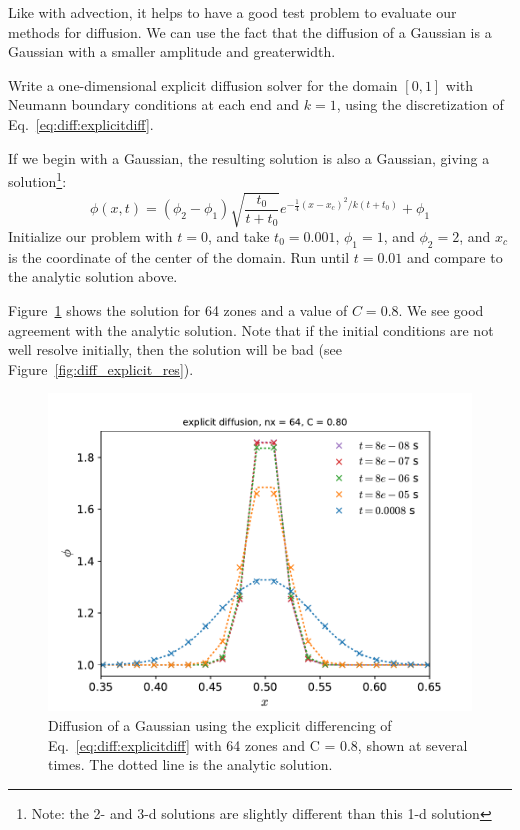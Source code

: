 Like with advection, it helps to have a good test problem to evaluate our
methods for diffusion.  We can use the fact that the diffusion of a Gaussian
is a Gaussian with a smaller amplitude and greaterwidth.

\begin{exercise}
{Write a one-dimensional explicit diffusion solver for the
  domain $[0,1]$ with Neumann boundary conditions at each end and $k = 1$,
  using the discretization of Eq.~\ref{eq:diff:explicitdiff}.

  If we begin with a Gaussian, the resulting solution is also a Gaussian,
  giving a solution\footnote{Note: the 2- and 3-d solutions are slightly different than this 1-d solution}:
  \begin{equation}
   \phi(x,t) = (\phi_2 - \phi_1) \sqrt{\frac{t_0}{t + t_0}} e^{-\frac{1}{4}(x - x_c)^2/k(t+t_0)} + \phi_1
  \end{equation}
  Initialize our problem with $t = 0$, and take
  $t_0 = 0.001$, $\phi_1 = 1$, and $\phi_2 = 2$, and $x_c$ is the
  coordinate of the center of the domain.  Run until $t = 0.01$ and
  compare to the analytic solution above.}
\end{exercise}


Figure~\ref{fig:diff_explicit} shows the solution for 64 zones
and a value of $C = 0.8$.  We see good agreement with the
analytic solution.  Note that if the initial conditions are
not well resolve initially, then the solution will be bad
(see Figure~\ref{fig:diff_explicit_res}).


\begin{figure}
\centering
\includegraphics[width=\linewidth]{diff-explicit-64}
\caption[Explicit diffusion of a Gaussian]{\label{fig:diff_explicit}
Diffusion of a Gaussian using the explicit differencing of
Eq.~\ref{eq:diff:explicitdiff} with 64 zones and C = 0.8, shown at
several times.  The dotted line is the analytic
solution.  \\ }
\end{figure}


